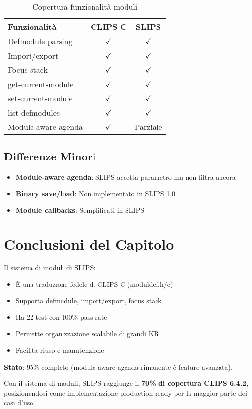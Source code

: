 \begin{table}[h]
\centering
\begin{tabular}{@{}lcc@{}}
\toprule
\textbf{Funzionalità} & \textbf{CLIPS C} & \textbf{SLIPS} \\
\midrule
Defmodule parsing & $\checkmark$ & $\checkmark$ \\
Import/export & $\checkmark$ & $\checkmark$ \\
Focus stack & $\checkmark$ & $\checkmark$ \\
get-current-module & $\checkmark$ & $\checkmark$ \\
set-current-module & $\checkmark$ & $\checkmark$ \\
list-defmodules & $\checkmark$ & $\checkmark$ \\
Module-aware agenda & $\checkmark$ & Parziale \\
\bottomrule
\end{tabular}
\caption{Copertura funzionalità moduli}
\label{tab:module_coverage}
\end{table}

\subsection{Differenze Minori}

\begin{itemize}
\item \textbf{Module-aware agenda}: SLIPS accetta parametro ma non filtra ancora
\item \textbf{Binary save/load}: Non implementato in SLIPS 1.0
\item \textbf{Module callbacks}: Semplificati in SLIPS
\end{itemize}

\section{Conclusioni del Capitolo}

Il sistema di moduli di SLIPS:

\begin{itemize}
\item È una traduzione fedele di CLIPS C (moduldef.h/c)
\item Supporta defmodule, import/export, focus stack
\item Ha 22 test con 100\% pass rate
\item Permette organizzazione scalabile di grandi KB
\item Facilita riuso e manutenzione
\end{itemize}

\textbf{Stato}: 95\% completo (module-aware agenda rimanente è feature avanzata).

\begin{successbox}[Achievement]
Con il sistema di moduli, SLIPS raggiunge il \textbf{70\% di copertura CLIPS 6.4.2}, posizionandosi come implementazione production-ready per la maggior parte dei casi d'uso.
\end{successbox}

